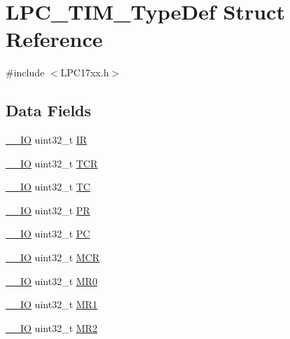 \hypertarget{structLPC__TIM__TypeDef}{}\section{L\+P\+C\+\_\+\+T\+I\+M\+\_\+\+Type\+Def Struct Reference}
\label{structLPC__TIM__TypeDef}


{\ttfamily \#include $<$L\+P\+C17xx.\+h$>$}

\subsection*{Data Fields}
\begin{DoxyCompactItemize}
\item 
\hyperlink{LPC17xx_8h_aec43007d9998a0a0e01faede4133d6be}{\+\_\+\+\_\+\+IO} uint32\+\_\+t \hyperlink{structLPC__TIM__TypeDef_a4c96cc8faf466faf959a22de39e80c0e}{IR}
\item 
\hyperlink{LPC17xx_8h_aec43007d9998a0a0e01faede4133d6be}{\+\_\+\+\_\+\+IO} uint32\+\_\+t \hyperlink{structLPC__TIM__TypeDef_a749720c431746c0e08fa59c2ebb1ca26}{T\+CR}
\item 
\hyperlink{LPC17xx_8h_aec43007d9998a0a0e01faede4133d6be}{\+\_\+\+\_\+\+IO} uint32\+\_\+t \hyperlink{structLPC__TIM__TypeDef_a2d70cc897d39c22a04328fc329790fa2}{TC}
\item 
\hyperlink{LPC17xx_8h_aec43007d9998a0a0e01faede4133d6be}{\+\_\+\+\_\+\+IO} uint32\+\_\+t \hyperlink{structLPC__TIM__TypeDef_afb73bd0a29f62603c2c88feffd0f97e2}{PR}
\item 
\hyperlink{LPC17xx_8h_aec43007d9998a0a0e01faede4133d6be}{\+\_\+\+\_\+\+IO} uint32\+\_\+t \hyperlink{structLPC__TIM__TypeDef_ae9ca163001bce16366eb455e09ab251e}{PC}
\item 
\hyperlink{LPC17xx_8h_aec43007d9998a0a0e01faede4133d6be}{\+\_\+\+\_\+\+IO} uint32\+\_\+t \hyperlink{structLPC__TIM__TypeDef_ae0a736fa03d1372de649065db757293e}{M\+CR}
\item 
\hyperlink{LPC17xx_8h_aec43007d9998a0a0e01faede4133d6be}{\+\_\+\+\_\+\+IO} uint32\+\_\+t \hyperlink{structLPC__TIM__TypeDef_a2e2a1b22f0a76479a69a33639295c80b}{M\+R0}
\item 
\hyperlink{LPC17xx_8h_aec43007d9998a0a0e01faede4133d6be}{\+\_\+\+\_\+\+IO} uint32\+\_\+t \hyperlink{structLPC__TIM__TypeDef_ab40a707ac932d071b85eac4f4765d1bb}{M\+R1}
\item 
\hyperlink{LPC17xx_8h_aec43007d9998a0a0e01faede4133d6be}{\+\_\+\+\_\+\+IO} uint32\+\_\+t \hyperlink{structLPC__TIM__TypeDef_a3f44977957876de84f42efddfa033b95}{M\+R2}

\end{DoxyCompactItemize}
